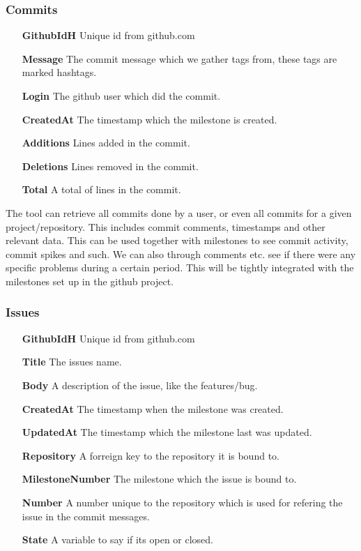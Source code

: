 \subsubsection*{Commits}
\vspace{0.5cm}
\begin{itemize}
    \item[\textbf{GithubIdH}]{Unique id from github.com}
    \item[\textbf{Message}]{The commit message which we gather tags from, these tags are marked hashtags.}
    \item[\textbf{Login}]{The github user which did the commit.}
    \item[\textbf{CreatedAt}]{The timestamp which the milestone is created.}
    \item[\textbf{Additions}]{Lines added in the commit.}
    \item[\textbf{Deletions}]{Lines removed in the commit.}
    \item[\textbf{Total}]{A total of lines in the commit.}
\end{itemize}
\vspace{0.5cm}

The tool can retrieve all commits done by a user, or even all commits for a given project/repository. This includes commit comments, timestamps and other relevant data. This can be used together with milestones to see commit activity, commit spikes and such. We can also through comments etc. see if there were any specific problems during a certain period. This will be tightly integrated with the milestones set up in the github project. 

\subsubsection*{Issues}
\vspace{0.5cm}
\begin{itemize}
    \item[\textbf{GithubIdH}]{Unique id from github.com}
    \item[\textbf{Title}]{The issues name.}
    \item[\textbf{Body}]{A description of the issue, like the features/bug.}
    \item[\textbf{CreatedAt}]{The timestamp when the milestone was created.}
    \item[\textbf{UpdatedAt}]{The timestamp which the milestone last was updated.}
    \item[\textbf{Repository}]{A forreign key to the repository it is bound to.}
    \item[\textbf{MilestoneNumber}]{The milestone which the issue is bound to.}
    \item[\textbf{Number}]{A number unique to the repository which is used for refering the issue in the commit messages.}
    \item[\textbf{State}]{A variable to say if its open or closed.}
\end{itemize}
\vspace{0.5cm}

